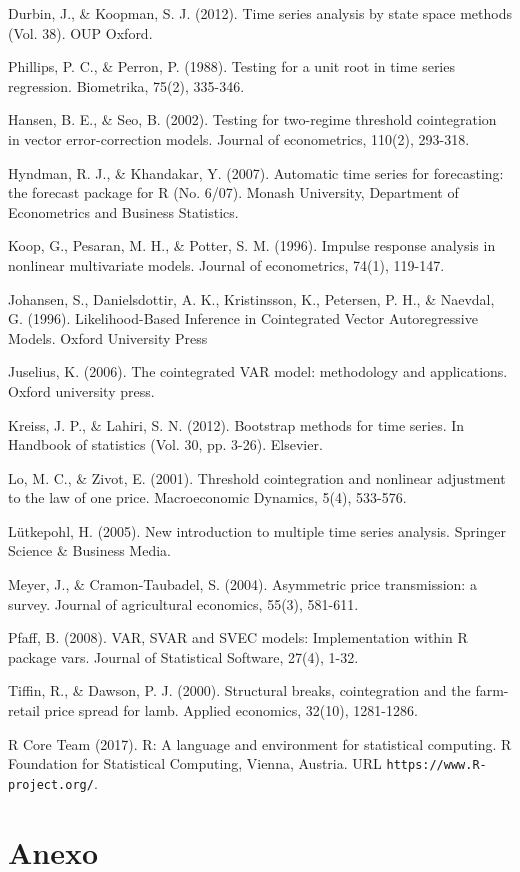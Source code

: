 \documentclass[12pt, twoside]{book}\usepackage[]{graphicx}\usepackage[]{color}
\numberwithin{equation}{section}
\numberwithin{theorem}{section}
\numberwithin{teorema}{section}
\numberwithin{defi}{section}
\numberwithin{prop}{section}
\numberwithin{defi}{section}
\theoremstyle{plain}
\begin{document}
Durbin, J., \& Koopman, S. J. (2012). Time series analysis by state space methods (Vol. 38). OUP Oxford.

Phillips, P. C., \& Perron, P. (1988). Testing for a unit root in time series regression. Biometrika, 75(2), 335-346.

Hansen, B. E., \& Seo, B. (2002). Testing for two-regime threshold cointegration in vector error-correction models. Journal of econometrics, 110(2), 293-318.

Hyndman, R. J., \& Khandakar, Y. (2007). Automatic time series for forecasting: the forecast package for R (No. 6/07). Monash University, Department of Econometrics and Business Statistics.

Koop, G., Pesaran, M. H., \& Potter, S. M. (1996). Impulse response analysis in nonlinear multivariate models. Journal of econometrics, 74(1), 119-147.

Johansen, S., Danielsdottir, A. K., Kristinsson, K., Petersen, P. H., \& Naevdal, G. (1996). Likelihood-Based Inference in Cointegrated Vector Autoregressive Models. Oxford University Press

Juselius, K. (2006). The cointegrated VAR model: methodology and applications. Oxford university press.

Kreiss, J. P., \& Lahiri, S. N. (2012). Bootstrap methods for time series. In Handbook of statistics (Vol. 30, pp. 3-26). Elsevier.

Lo, M. C., \& Zivot, E. (2001). Threshold cointegration and nonlinear adjustment to the law of one price. Macroeconomic Dynamics, 5(4), 533-576.

Lütkepohl, H. (2005). New introduction to multiple time series analysis. Springer Science \& Business Media.

Meyer, J., \& Cramon‐Taubadel, S. (2004). Asymmetric price transmission: a survey. Journal of agricultural economics, 55(3), 581-611.

 Pfaff, B. (2008). VAR, SVAR and SVEC models: Implementation within R package vars. Journal of Statistical Software, 27(4), 1-32.

Tiffin, R., \& Dawson, P. J. (2000). Structural breaks, cointegration and the farm-retail price spread for lamb. Applied economics, 32(10), 1281-1286.

R Core Team (2017). R: A language and environment for statistical computing.
  R Foundation for Statistical Computing, Vienna, Austria. URL
  \texttt{https://www.R-project.org/}.

  
\chapter{Anexo}
\end{document}
